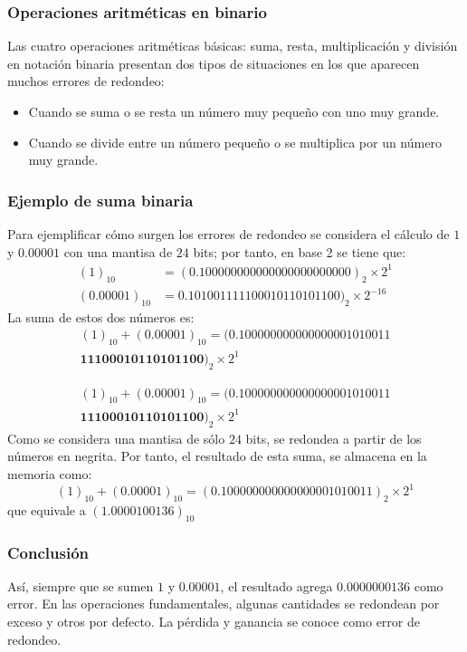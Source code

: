 \begin{frame}
\frametitle{Operaciones aritméticas en binario}
Las cuatro operaciones aritméticas básicas: suma, resta, multiplicación y división en notación binaria presentan dos tipos de situaciones en los que aparecen muchos errores de redondeo:
\begin{itemize}
\item Cuando se suma o se resta un número muy pequeño con uno muy grande.
\item Cuando se divide entre un número pequeño o se multiplica por un número muy grande.
\end{itemize}
\end{frame}
\begin{frame}
\frametitle{Ejemplo de suma binaria}
Para ejemplificar cómo surgen los errores de redondeo se considera el cálculo de $1$ y $0.00001$ con una mantisa de $24$ bits; por tanto, en base 2 se tiene que:
\begin{eqnarray*}
(1)_{10} &= (0.1000 0000 0000 0000 0000 0000)_{2} \times 2^{1} \\
(0.00001)_{10} &= 0.1010 0111 1100 0101 1010 1100)_{2} \times 2^{-16}
\end{eqnarray*}
La suma de estos dos números es:
\[ \begin{split}
(1)_{10} + (0.00001)_{10}  = (0.1000 0000 0000 0000 0101 0011 \\
 \mathbf{1110 0010 1101 0110 0})_{2} \times 2^{1}
\end{split} \]
\end{frame}
\begin{frame}
\[ \begin{split}
(1)_{10} + (0.00001)_{10}  = (0.1000 0000 0000 0000 0101 0011 \\
 \mathbf{1110 0010 1101 0110 0})_{2} \times 2^{1}
\end{split} \]
Como se considera una mantisa de sólo $24$ bits, se redondea a partir de los números en negrita. Por tanto, el resultado de esta suma, se almacena en la memoria como:
\[ (1)_{10} + (0.00001)_{10}  = (0.1000 0000 0000 0000 0101 0011)_{2} \times 2^{1} \]
que equivale a $(1.0000 1001 36)_{10}$
\end{frame}
\begin{frame}
\frametitle{Conclusión}
Así, siempre que se sumen $1$ y $0.00001$, el resultado agrega $0.0000000136$ como error. En las operaciones fundamentales, algunas cantidades se redondean por exceso y otros por defecto. La pérdida y ganancia se conoce como error de redondeo.
\end{frame}
